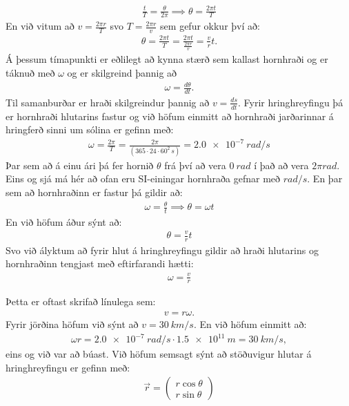 \begin{align*}
    \frac{t}{T} = \frac{\theta}{2\pi} \implies \theta = \frac{2\pi t}{T}
\end{align*}
En við vitum að $v = \frac{2\pi r}{T}$ svo $T = \frac{2\pi r}{v}$ sem gefur okkur því að:
\begin{align*}
    \theta = \frac{2\pi t}{T} = \frac{2\pi t}{\frac{2\pi r}{v}} = \frac{v}{r}t.
\end{align*}
Á þessum tímapunkti er eðlilegt að kynna stærð sem kallast hornhraði og er táknuð með $\omega$ og er skilgreind þannig að
\begin{align*}
    \omega = \frac{d\theta}{dt}.
\end{align*}
Til samanburðar er hraði skilgreindur þannig að $v = \frac{ds}{dt}$. Fyrir hringhreyfingu þá er hornhraði hlutarins fastur og við höfum einmitt að hornhraði jarðarinnar á hringferð sinni um sólina er gefinn með:
\begin{align*}
    \omega = \frac{2\pi}{T} = \frac{2\pi}{(365 \cdot 24 \cdot 60^2 \, \si{s})} = \SI{2.0e-7}{rad/s}
\end{align*}
Þar sem að á einu ári þá fer hornið $\theta$ frá því að vera $\SI{0}{rad}$ í það að vera $2\pi \si{rad}$. Eins og sjá má hér að ofan eru SI-einingar hornhraða gefnar með $\si{rad/s}$. En þar sem að hornhraðinn er fastur þá gildir að:
\begin{align*}
    \omega = \frac{\theta}{t} \implies \theta = \omega t
\end{align*}
En við höfum áður sýnt að:
\begin{align*}
    \theta = \frac{v}{r}t
\end{align*}
Svo við ályktum að fyrir hlut á hringhreyfingu gildir að hraði hlutarins og hornhraðinn tengjast með eftirfarandi hætti:
\begin{align*}
    \omega = \frac{v}{r}
\end{align*}

Þetta er oftast skrifað línulega sem:
\begin{align*}
    v  = r\omega.
\end{align*}
Fyrir jörðina höfum við sýnt að $v = \SI{30}{km/s}$. En við höfum einmitt að:
\begin{align*}
    \omega r = \SI{2.0e-7}{rad/s} \cdot \SI{1.5e11}{m} = \SI{30}{km/s},
\end{align*}
eins og við var að búast. Við höfum semsagt sýnt að stöðuvigur hlutar á hringhreyfingu er gefinn með:
\begin{align*}
    \vec{r} = \begin{pmatrix} r\cos\theta \\ r\sin\theta \end{pmatrix}
\end{align*}

